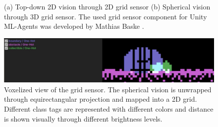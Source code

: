 \begin{figure}[!ht]
    \centering
        \caption{
            (a) Top-down 2D vision through 2D grid sensor (b) Spherical vision through 3D grid sensor. The used grid sensor component for Unity ML-Agents was developed by Mathias Baske \cite{github-mbaske-gridsensor}. 
        }
        \label{fig:gridsensor-3d}
\end{figure}


\begin{figure}[!ht]
        \centering
        \includegraphics[width=1\textwidth]{images/gridsensor_voxelized_view.png}
        \caption{Voxelized view of the grid sensor. The spherical vision is unwrapped through equirectangular projection and mapped into a 2D grid. Different class tags are represented with different colors and distance is shown visually through different brightness levels.}
        \label{fig:gridsensor_voxelized_view}
\end{figure}


